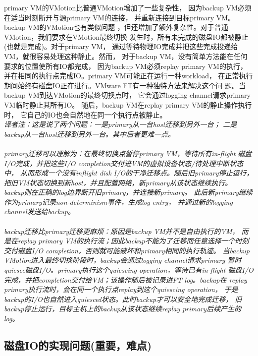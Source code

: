 primary VM的VMotion比普通VMotion增加了一些复杂性，%
因为backup VM必须在适当时刻断开与源primary VM的连接，%
并重新连接到目标primary VM。backup VM的VMotion也有类似问题%
，但还增加了额外复杂性。对于普通VMotion，我们要求在VMotion最终切换%
发生时，所有未完成的磁盘IO都被静止(也就是完成)。对于primary VM，%
通过等待物理IO完成并把这些完成投递给VM，就很容易处理这种静止。然而，%
对于backup VM，没有简单方法能在任何要求的位置使所有IO都完成，%
因为backup VM必须replay primary VM的执行，%
并在相同的执行点完成IO。primary VM可能正在运行一种workload，%
在正常执行期间始终有磁盘IO正在进行。VMware FT有一种独特方法来解决这个问%
题。当backup VM到达VMotion的最终切换点时，%
它会通过logging channel请求primary VM临时静止其所有IO。%
随后，backup VM在replay primary VM的静止操作执行时，%
它自己的IO也会自然地在同一个执行点被静止。
\\\emph{译者注：这是说了两个问题：一是primary从一台host迁移到另外一台；%
二是backup从一台host迁移到另外一台。其中后者更难一点。
\\\\primary迁移可以理解为：在最终切换点暂停primary VM，等待所有in-flight%
磁盘I/O完成，并把这些I/O completion交付进VM的虚拟设备状态/待处理中断状态中，%
从而形成一个没有inflight disk I/O的干净迁移点。随后旧primary停止运行，%
把旧VM状态切换到新host，并且配置网络，新primary从该状态继续执行。%
backup则在正确的log边界断开旧primary，并连接新primary。%
此后新primary继续作为primary记录non-determinism事件，生成log entry，%
并通过新的logging channel发送给backup。%
\\\\backup迁移比primary迁移更麻烦：原因是backup VM并不是自由执行的VM，%
而是在replay primary VM的执行流；因此backup不能为了迁移而任意选择一个时刻%
交付磁盘I/O completion，否则就可能破坏和primary相同的执行轨迹。%
当backup VMotion进入最终切换阶段时，backup会通过logging channel请求primary%
暂时quiesce磁盘I/O。primary执行这个quiescing operation，等待已有in-flight%
磁盘I/O完成，并把completion交付给VM；该操作随后被记录进FT log。backup在%
replay primary执行流时，会在同一个执行点replay到这个quiescing operation，%
于是backup的I/O也自然进入quiesced状态。此时backup才可以安全地完成迁移，%
旧backup停止运行，目标主机上的backup从该状态继续replay primary后续产生的log。}%

\subsection{磁盘IO的实现问题(重要，难点)}

